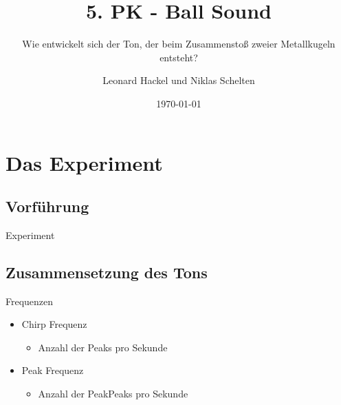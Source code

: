 \documentclass[11pt]{beamer}
\author{Leonard Hackel und Niklas Schelten}
\title{5. PK - Ball Sound}
\subtitle{Wie entwickelt sich der Ton, der beim Zusammenstoß zweier Metallkugeln entsteht?}
\institute{Herder Oberschule Berlin}
\date{\today}
\begin{document}
\begin{frame}
\titlepage
\end{frame}

\begin{frame}
\tableofcontents
\end{frame}

\section{Das Experiment}
\subsection{Vorführung}
\begin{frame}{Experiment}

\end{frame}

\subsection{Zusammensetzung des Tons}
\begin{frame}{}
\end{frame}

\begin{frame}{Frequenzen}
\begin{itemize}
\item<1-> Chirp Frequenz
	\begin{itemize}
	\item<2->[$\rightarrow$] Anzahl der Peaks pro Sekunde
	\end{itemize}
\item<3-> Peak Frequenz
	\begin{itemize}
	\item<4->[$\rightarrow$] Anzahl der PeakPeaks pro Sekunde
	\end{itemize}
\end{itemize}
\end{frame}
\end{document}
